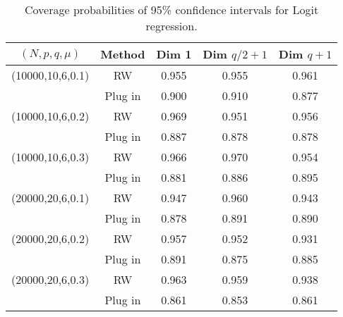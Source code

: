 \documentclass[12pt]{article}
\begin{document}
\begin{table}[!h]
	\centering
	\caption{Coverage probabilities of 95\% confidence intervals for Logit regression. }
	\medskip
	\label{tab:sim2}
	\begin{tabular}{ccccc}
		\hline
		$(N, p, q, \mu)$ & Method &Dim 1& Dim $q/2+1$ & Dim $q+1$\\
		\hline\hline
		(10000,10,6,0.1)  & RW & 0.955& 0.955& 0.961\\
		&Plug in & 0.900& 0.910& 0.877\\
		\hline
		(10000,10,6,0.2) & RW & 0.969& 0.951& 0.956\\
		&Plug in & 0.887& 0.878& 0.878\\
		\hline
		(10000,10,6,0.3) & RW & 0.966&  0.970& 0.954\\
		&Plug in & 0.881& 0.886& 0.895\\
		\hline
		(20000,20,6,0.1) & RW & 0.947& 0.960& 0.943\\
		&Plug in & 0.878& 0.891& 0.890\\
		\hline
		(20000,20,6,0.2)& RW & 0.957& 0.952& 0.931\\
		&Plug in & 0.891& 0.875& 0.885\\
		\hline
		(20000,20,6,0.3) & RW & 0.963& 0.959& 0.938\\
		&Plug in & 0.861& 0.853& 0.861\\
		\hline
	\end{tabular}
\end{table}
\end{document}

